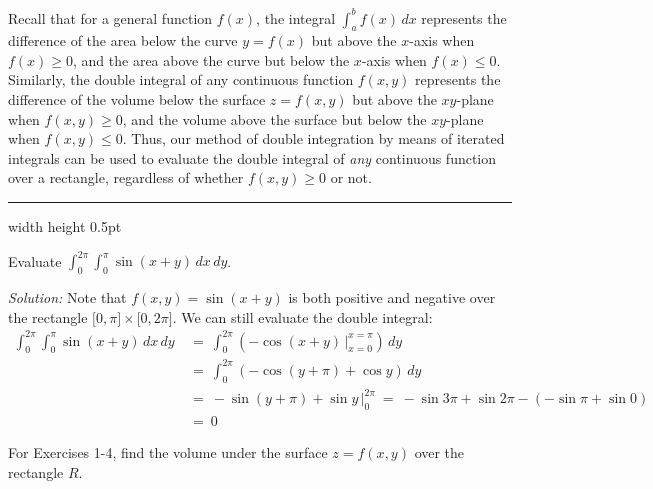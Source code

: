Recall that for a general function $f(x)$, the integral $\int_a^b f(x)\, dx$ represents the difference of the area
below the curve $y=f(x)$ but above the $x$-axis when $f(x) \ge 0$, and the area above the curve but below the $x$-axis
when $f(x) \le 0$. Similarly, the double integral of any continuous function $f(x,y)$ represents the difference of the
volume below the surface $z=f(x,y)$ but above the $xy$-plane when $f(x,y) \ge 0$, and the volume above the surface but
below the $xy$-plane when $f(x,y) \le 0$. Thus, our method of double integration by means of iterated integrals can
be used to evaluate the double integral of \emph{any} continuous function over a rectangle, regardless of whether
$f(x,y) \ge 0$ or not.

\vspace{3mm}
\hrule width \textwidth height 0.5pt
\begin{exmp}
 Evaluate $\displaystyle\int_0^{2\pi} \displaystyle\int_0^{\pi} \sin (x+y) \,dx\,dy$.\vspace{1mm}
 \par\noindent \emph{Solution:} Note that $f(x,y) = \sin (x+y)$ is both positive and negative over the rectangle
 $\lbrack 0,\pi \rbrack \times \lbrack 0,2\pi \rbrack$. We can still evaluate the double integral:
 \begin{align*}
  \int_0^{2\pi} \int_0^{\pi} \sin (x+y) \,dx\,dy
   ~&=~ \int_0^{2\pi} \left( -\cos (x+y) \,\Big|_{x=0}^{x=\pi} \right) \,dy\\
   &=~ \int_0^{2\pi} (-\cos (y+\pi) + \cos y) \,dy\\
   &=~ -\sin (y+\pi) + \sin y \,\Big|_0^{2\pi} ~=~ -\sin 3\pi + \sin 2\pi - (-\sin \pi + \sin 0)\\
   &=~ 0
 \end{align*}
\end{exmp}
\startexercises\label{sec3dot1}
\par\noindent For Exercises 1-4, find the volume under the surface $z=f(x,y)$ over the rectangle $R$.
